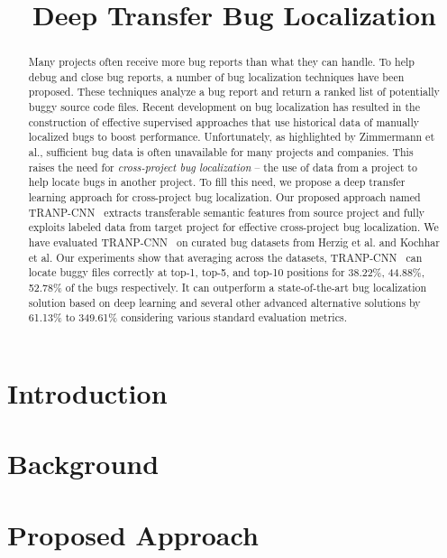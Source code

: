 \documentclass[sigconf]{acmart}
\newcommand{\TRANPCNN}{TRANP-CNN }
\begin{document}
\title{Deep Transfer Bug Localization}

\begin{abstract}
Many projects often receive more bug reports than what they can handle. To help debug and close bug reports, a number of bug localization techniques have been proposed. These techniques analyze a bug report and return a ranked list of potentially buggy source code files. Recent development on bug localization has resulted in the construction of effective supervised approaches that use historical data of manually localized bugs to boost performance. Unfortunately, as highlighted by Zimmermann et al., sufficient bug data is often unavailable for many projects and companies. This raises the need for {\em cross-project bug localization} -- the use of data from a project to help locate bugs in another project. To fill this need, we propose a deep transfer learning approach for cross-project bug localization. Our proposed approach named \TRANPCNN\ extracts transferable semantic features from source project and fully exploits labeled data from target project for effective cross-project bug localization. We have evaluated \TRANPCNN\ on curated bug datasets from Herzig et al. and Kochhar et al. Our experiments show that averaging across the datasets, \TRANPCNN\ can locate buggy files correctly at top-1, top-5, and top-10 positions for 38.22\%, 44.88\%, 52.78\% of the bugs respectively. It can outperform a state-of-the-art bug localization solution based on deep learning and several other advanced alternative solutions by 61.13\% to 349.61\% considering various standard evaluation metrics.
\end{abstract}

\maketitle

\section{Introduction}\label{sec.intro}


\section{Background}\label{sec.background}

	
\section{Proposed Approach}\label{sec.approach}

\end{document}

